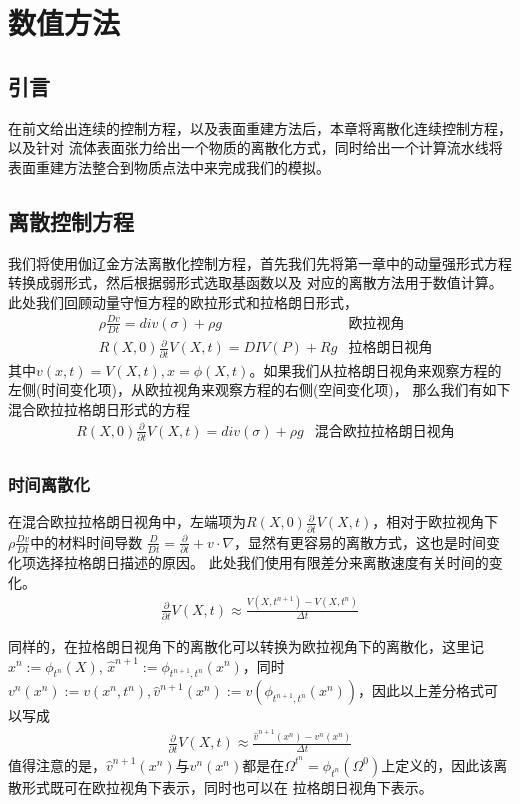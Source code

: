 \chapter{数值方法} \label{chap4}
\section{引言}
在前文给出连续的控制方程，以及表面重建方法后，本章将离散化连续控制方程，以及针对
流体表面张力给出一个物质的离散化方式，同时给出一个计算流水线将表面重建方法整合到物质点法中来完成我们的模拟。
\section{离散控制方程}
我们将使用伽辽金方法离散化控制方程，首先我们先将第一章中的动量强形式方程转换成弱形式，然后根据弱形式选取基函数以及
对应的离散方法用于数值计算。此处我们回顾动量守恒方程的欧拉形式和拉格朗日形式，
\begin{align*}    
    &\rho \frac{Dv}{Dt} = div(\sigma) + \rho g & \text{欧拉视角}\\
    &R(X,0)\frac{\partial}{\partial t} V(X,t) = DIV(P) + Rg &\text{拉格朗日视角}
\end{align*}
其中$v(x,t) = V(X,t), x = \phi(X,t)$。如果我们从拉格朗日视角来观察方程的左侧(时间变化项)，从欧拉视角来观察方程的右侧(空间变化项)，
那么我们有如下混合欧拉拉格朗日形式的方程
\begin{align*}
    &R(X,0)\frac{\partial}{\partial t} V(X,t) = div(\sigma) + \rho g & \text{混合欧拉拉格朗日视角}\\ 
\end{align*}
\subsection{时间离散化}
在混合欧拉拉格朗日视角中，左端项为$R(X,0)\frac{\partial}{\partial t}V(X,t)$，相对于欧拉视角下$\rho \frac{Dv}{Dt}$中的材料时间导数
$\frac{D}{Dt} = \frac{\partial}{\partial t} + v\cdot \nabla$，显然有更容易的离散方式，这也是时间变化项选择拉格朗日描述的原因。
此处我们使用有限差分来离散速度有关时间的变化。
\begin{align*}
    \frac{\partial}{\partial t} V(X,t) \approx \frac{V(X,t^{n+1}) - V(X,t^n)}{\Delta t}
\end{align*}

同样的，在拉格朗日视角下的离散化可以转换为欧拉视角下的离散化，这里记$x^{n} := \phi_{t^n}(X)$, $\hat{x}^{n+1} := \phi_{t^{n+1},t^n}(x^n)$，同时
$v^n(x^n) := v(x^n,t^n), \hat{v}^{n+1}(x^n) := v(\phi_{t^{n+1},t^n}(x^n))$，因此以上差分格式可以写成
\begin{align*}
    \frac{\partial}{\partial t} V(X,t) \approx \frac{\hat{v}^{n+1}(x^n) - v^n(x^n)}{\Delta t}
\end{align*}
值得注意的是，$\hat{v}^{n+1}(x^n)$与$v^n(x^n)$都是在$\Omega^{t^n} = \phi_{t^n}(\Omega^0)$上定义的，因此该离散形式既可在欧拉视角下表示，同时也可以在
拉格朗日视角下表示。
